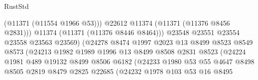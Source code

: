 \begin{lexlean}{RustStd}
\begin{coremodule}
                                            (@11371 (@11554 @1966 @53)))
                                          @22612
                                          @11374
                                          (@11371 (@11376 @8456 @2831)))
                                        @11374
                                        (@11371 (@11376 @8446 @8464)))
                                      @23548
                                      @23551
                                      @23554
                                      @23558
                                      @23563
                                      @23569)
                                    (@24278
                                      @8474
                                      @1997
                                      @2023
                                      @13
                                      @8499
                                      @8523
                                      @8549
                                      @8573
                                      (@24213
                                        @1982
                                        @1989
                                        @1996
                                        @13
                                        @8499
                                        @8508
                                        @2831
                                        @8523
                                        (@24224
                                          @1981
                                          @489
                                          @19132
                                          @8499
                                          @8506
                                          @6182
                                          (@24233
                                            @1980
                                            @53
                                            @55
                                            @4647
                                            @8498
                                            @8505
                                            @2819
                                            @8479
                                            @2825
                                            @22685
                                            (@24232
                                              @1978
                                              @103
                                              @53
                                              @16
                                              @8495

\end{coremodule}
\end{lexlean}
